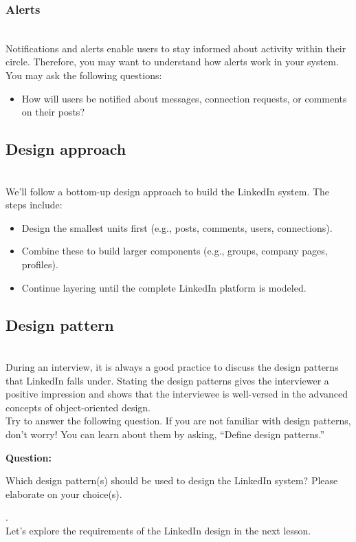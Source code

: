 \subsubsection{Alerts}\label{zFvYTq0vpb5ZfVBAwB6W2}
\\
Notifications and alerts enable users to stay informed about activity within their circle. Therefore, you may want to understand how alerts work in your system. You may ask the following questions:

\begin{itemize}
\item
\protect{}\label{0hn0qGMWYin6fQ-OjCKaM}
How will users be notified about messages, connection requests, or comments on their posts?
\end{itemize}

\subsection{Design approach}\label{8SKp8Noe0yP0-ji5F2BPW}
\\
We'll follow a bottom-up design approach to build the LinkedIn system. The steps include:

\begin{itemize}
\item
Design the smallest units first (e.g., posts, comments, users, connections).
\item
Combine these to build larger components (e.g., groups, company pages, profiles).
\item
Continue layering until the complete LinkedIn platform is modeled.
\end{itemize}

\subsection{Design pattern~}\label{VD8QsBZg9_Th1KK6XiY9w}
\\
During an interview, it is always a good practice to discuss the design patterns that LinkedIn falls under. Stating the design patterns gives the interviewer a positive impression and shows that the interviewee is well-versed in the advanced concepts of object-oriented design.
\\
Try to answer the following question. If you are not familiar with design patterns, don't worry! You can learn about them by asking, ``Define design patterns.''

\textbf{Question:}

Which design pattern(s) should be used to design the LinkedIn system? Please elaborate on your choice(s).

.
\\
Let's explore the requirements of the LinkedIn design in the next lesson.

